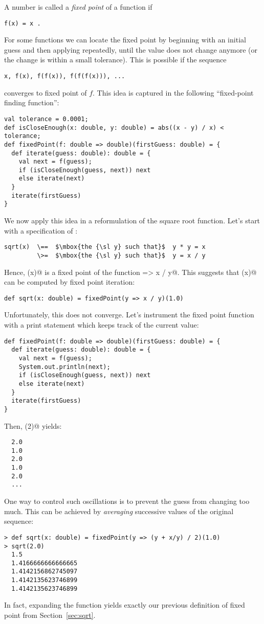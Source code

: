 \documentclass[11pt]{book}
\begin{document}
A number \verb@x@ is called a {\em fixed point} of a function \verb@f@ if
\begin{verbatim}
f(x) = x .
\end{verbatim}
For some functions \verb@f@ we can locate the fixed point by beginning
with an initial guess and then applying \verb@f@ repeatedly, until the
value does not change anymore (or the change is within a small
tolerance). This is possible if the sequence
\begin{verbatim}
x, f(x), f(f(x)), f(f(f(x))), ...
\end{verbatim}
converges to fixed point of $f$. This idea is captured in
the following ``fixed-point finding function'':
\begin{verbatim}
val tolerance = 0.0001;
def isCloseEnough(x: double, y: double) = abs((x - y) / x) < tolerance;
def fixedPoint(f: double => double)(firstGuess: double) = {
  def iterate(guess: double): double = {
    val next = f(guess);
    if (isCloseEnough(guess, next)) next
    else iterate(next)
  }
  iterate(firstGuess)
}
\end{verbatim}
We now apply this idea in a reformulation of the square root function.
Let's start with a specification of \verb@sqrt@:
\begin{verbatim}
sqrt(x)  \==  $\mbox{the {\sl y} such that}$  y * y = x
         \>=  $\mbox{the {\sl y} such that}$  y = x / y
\end{verbatim}
Hence, \verb@sqrt(x)@ is a fixed point of the function \verb@y => x / y@.
This suggests that \verb@sqrt(x)@ can be computed by fixed point iteration:
\begin{verbatim}
def sqrt(x: double) = fixedPoint(y => x / y)(1.0)
\end{verbatim}
Unfortunately, this does not converge. Let's instrument the fixed point
function with a print statement which keeps track of the current
\verb@guess@ value:
\begin{verbatim}
def fixedPoint(f: double => double)(firstGuess: double) = {
  def iterate(guess: double): double = {
    val next = f(guess);
    System.out.println(next);
    if (isCloseEnough(guess, next)) next
    else iterate(next)
  }
  iterate(firstGuess)
}
\end{verbatim}
Then, \verb@sqrt(2)@ yields:
\begin{verbatim}
  2.0
  1.0
  2.0
  1.0
  2.0
  ...
\end{verbatim}
One way to control such oscillations is to prevent the guess from changing too much. 
This can be achieved by {\em averaging} successive values of the original sequence:
\begin{verbatim}
> def sqrt(x: double) = fixedPoint(y => (y + x/y) / 2)(1.0)
> sqrt(2.0)
  1.5
  1.4166666666666665
  1.4142156862745097
  1.4142135623746899
  1.4142135623746899
\end{verbatim}
In fact, expanding the \verb@fixedPoint@ function yields exactly our 
previous definition of fixed point from Section~\ref{sec:sqrt}.
\end{document}
